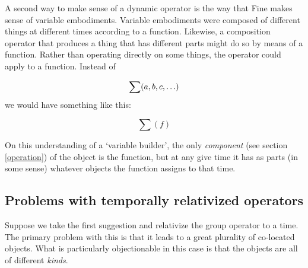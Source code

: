 \documentclass[11pt]{article}
\begin{document}
\begin{spacing}{1.5}
A second way to make sense of a dynamic operator is the way that Fine
makes sense of variable embodiments.  Variable embodiments were
composed of different things at different times according to a
function.  Likewise, a composition operator that produces a thing that
has different parts might do so by means of a function.  Rather than
operating directly on some things, the operator could apply to a
function.  Instead of

\begin{displaymath}
\sum (a, b, c, \mathellipsis )
\end{displaymath}
we would have something like this:

\begin{displaymath}
\sum ( f )
\end{displaymath}

On this understanding of a `variable builder', the only {\em
  component} (see section \ref{operation}) of the object is the
function, but at any give time it has as parts (in some sense)
whatever objects the function assigns to that time.




\subsection{Problems with temporally relativized operators}
\label{op1}
Suppose we take the first suggestion and relativize the group operator
to a time.  The primary problem with this is that it leads to a great
plurality of co-located objects.  What is particularly objectionable
in this case is that the objects are all of different {\em kinds}.


\end{spacing}
\end{document}
